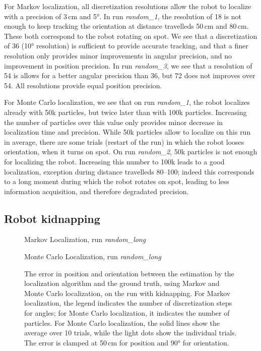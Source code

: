 \documentclass[letterpaper, 10pt, conference]{ieeeconf}
\begin{document}
For Markov localization, all discretization resolutions allow the robot to localize with a precision of 3\,cm and 5°.
In run \emph{random\_1}, the resolution of 18 is not enough to keep tracking the orientation at distance travelleds 50\,cm and 80\,cm.
These both correspond to the robot rotating on spot.
We see that a discretization of 36 (10° resolution) is sufficient to provide accurate tracking, and that a finer resolution only provides minor improvements in angular precision, and no improvement in position precision.
In run \emph{random\_3}, we see that a resolution of 54 is allows for a better angular precision than 36, but 72 does not improves over 54.
All resolutions provide equal position precision.

For Monte Carlo localization, we see that on run \emph{random\_1}, the robot localizes already with 50k particles, but twice later than with 100k particles.
Increasing the number of particles over this value only provides minor decrease in localization time and precision.
While 50k particles allow to localize on this run in average, there are some trials (restart of the run) in which the robot looses orientation, when it turns on spot.
On run \emph{random\_2}, 50k particles is not enough for localizing the robot.
Increasing this number to 100k leads to a good localization, exception during distance travelleds 80--100; indeed this corresponds to a long moment during which the robot rotates on spot, leading to less information acquisition, and therefore degradated precision.

\subsection{Robot kidnapping}

\begin{figure}

\begin{center}
Markov Localization, run \emph{random\_long}
\end{center}

\vspace{.5em}

\begin{center}
Monte Carlo Localization, run \emph{random\_long}
\end{center}

\caption{The error in position and orientation between the estimation by the localization algorithm and the ground truth, using Markov and Monte Carlo localization, on the run with kidnapping.
For Markov localization, the legend indicates the number of discretization steps for angles; for Monte Carlo localization, it indicates the number of particles.
For Monte Carlo localization, the solid lines show the average over 10 trials, while the light dots show the individual trials.
The error is clamped at 50\,cm for position and 90° for orientation.}
\label{fig:whole-runs-random-long}
\end{figure}
\end{document}
